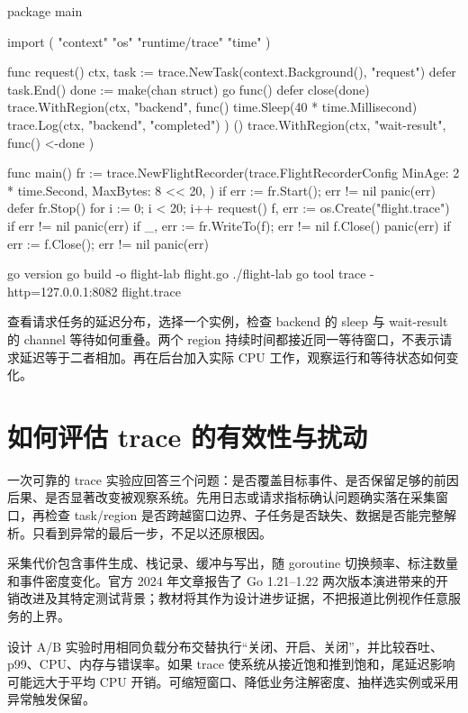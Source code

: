 \documentclass[UTF8,fontset=fandol,openany,11pt]{ctexbook}
\begin{document}
\begin{codeblock}
package main

import (
	"context"
	"os"
	"runtime/trace"
	"time"
)

func request() {
	ctx, task := trace.NewTask(context.Background(), "request")
	defer task.End()
	done := make(chan struct{})
	go func() {
		defer close(done)
		trace.WithRegion(ctx, "backend", func() {
			time.Sleep(40 * time.Millisecond)
			trace.Log(ctx, "backend", "completed")
		})
	}()
	trace.WithRegion(ctx, "wait-result", func() { <-done })
}

func main() {
	fr := trace.NewFlightRecorder(trace.FlightRecorderConfig{
		MinAge:   2 * time.Second,
		MaxBytes: 8 << 20,
	})
	if err := fr.Start(); err != nil {
		panic(err)
	}
	defer fr.Stop()
	for i := 0; i < 20; i++ {
		request()
	}
	f, err := os.Create("flight.trace")
	if err != nil {
		panic(err)
	}
	if _, err := fr.WriteTo(f); err != nil {
		f.Close()
		panic(err)
	}
	if err := f.Close(); err != nil {
		panic(err)
	}
}
\end{codeblock}

\begin{codeblock}
go version
go build -o flight-lab flight.go
./flight-lab
go tool trace -http=127.0.0.1:8082 flight.trace
\end{codeblock}

查看请求任务的延迟分布，选择一个实例，检查 backend 的 sleep 与 wait-result 的 channel 等待如何重叠。两个 region 持续时间都接近同一等待窗口，不表示请求延迟等于二者相加。再在后台加入实际 CPU 工作，观察运行和等待状态如何变化。

\section{如何评估 trace 的有效性与扰动}
一次可靠的 trace 实验应回答三个问题：是否覆盖目标事件、是否保留足够的前因后果、是否显著改变被观察系统。先用日志或请求指标确认问题确实落在采集窗口，再检查 task/region 是否跨越窗口边界、子任务是否缺失、数据是否能完整解析。只看到异常的最后一步，不足以还原根因。

采集代价包含事件生成、栈记录、缓冲与写出，随 goroutine 切换频率、标注数量和事件密度变化。官方 2024 年文章报告了 Go 1.21–1.22 两次版本演进带来的开销改进及其特定测试背景；教材将其作为设计进步证据，不把报道比例视作任意服务的上界。\cite{tools-trace2024}

设计 A/B 实验时用相同负载分布交替执行“关闭、开启、关闭”，并比较吞吐、p99、CPU、内存与错误率。如果 trace 使系统从接近饱和推到饱和，尾延迟影响可能远大于平均 CPU 开销。可缩短窗口、降低业务注解密度、抽样选实例或采用异常触发保留。
\end{document}
